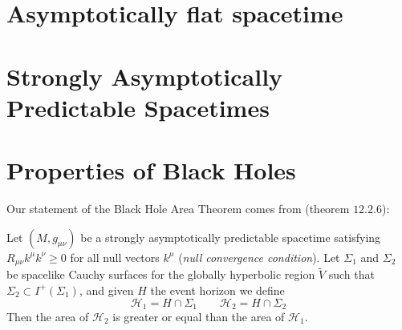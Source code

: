 \section{Asymptotically flat spacetime}

\section{Strongly Asymptotically Predictable Spacetimes}

\section{Properties of Black Holes}


Our statement of the Black Hole Area Theorem comes from \cite{wald2010general} (theorem \(12.2.6\)):
\begin{theorem}
	Let \((M, g_{\mu\nu})\) be a strongly asymptotically predictable spacetime satisfying \(R_{\mu\nu}k^{\mu}k^{\nu} \ge 0\) for all null vectors \(k^{\mu}\) (\emph{null convergence condition}). Let \(\Sigma_1\) and \(\Sigma_2\) be spacelike Cauchy surfaces for the globally hyperbolic region \(\tilde{V}\) such that \(\Sigma_2 \subset I^+(\Sigma_1)\), and given \(H\) the event horizon we define
	\[
	\mathscr{H}_1 = H \cap \Sigma_1 \quad \quad \mathscr{H}_2 = H \cap \Sigma_2
	\]
	Then the area of \(\mathcal{H}_2\) is greater or equal than the area of \(\mathcal{H}_1\).
\end{theorem}

